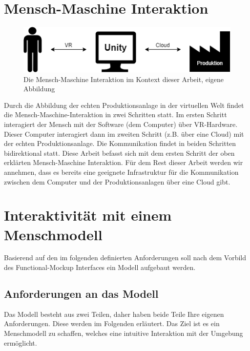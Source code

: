 \section{Mensch-Maschine Interaktion}\label{sec:MMInteraktion}
\begin{figure}[h]
	\centering
	\includegraphics[width=0.7\linewidth]{Bilder/A19_MMI}
	\caption{Die Mensch-Maschine Interaktion im Kontext dieser Arbeit, eigene Abbildung}
	\label{fig:MMI}
\end{figure}
\noindent Durch die Abbildung der echten Produktionsanlage in der virtuellen Welt findet die Mensch-Maschine-Interaktion in zwei Schritten statt. Im ersten Schritt interagiert der Mensch mit der Software (dem Computer) über VR-Hardware. Dieser Computer interagiert dann im zweiten Schritt (z.B. über eine Cloud) mit der echten Produktionsanlage. Die Kommunikation findet in beiden Schritten bidirektional statt.
\newline
Diese Arbeit befasst sich mit dem ersten Schritt der oben erklärten Mensch-Maschine Interaktion. Für dem Rest dieser Arbeit werden wir annehmen, dass es bereits eine geeignete Infrastruktur für die Kommunikation zwischen dem Computer und der Produktionsanlagen über eine Cloud gibt.

\section{Interaktivität mit einem Menschmodell}\label{sec:ModellAufbau}
Basierend auf den im folgenden definierten Anforderungen soll nach dem Vorbild des Functional-Mockup Interfaces ein Modell aufgebaut werden.

\subsection{Anforderungen an das Modell}\label{sec:AnforderungenKonzept}
Das Modell besteht aus zwei Teilen, daher haben beide Teile Ihre eigenen Anforderungen. Diese werden im Folgenden erläutert. Das Ziel ist es ein Menschmodell zu schaffen, welches eine intuitive Interaktion mit der Umgebung ermöglicht.

